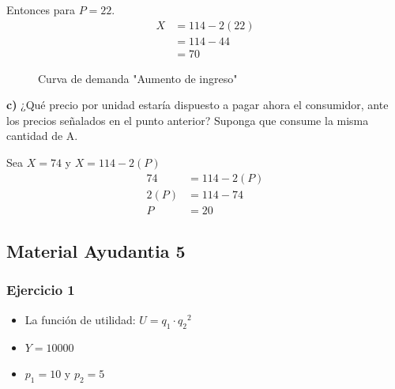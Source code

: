 \documentclass{templateNote}
\begin{document}
Entonces para $P = 22$.
\begin{align*}
    X &= 114 -2(22) \\
    &= 114 -44 \\
    &= 70
\end{align*}

\begin{figure}[H]
    \centering
    \caption{Curva de demanda "Aumento de ingreso"}
\end{figure}

\textbf{c)} ¿Qué precio por unidad estaría dispuesto a pagar ahora el consumidor, ante los
precios señalados en el punto anterior? Suponga que consume la misma cantidad
de A.

Sea $X = 74$ y $X = 114 -2(P)$\\
\begin{align*}
    74 &= 114 -2(P) \\
    2(P) &= 114 -74 \\
    P &= 20
\end{align*}

\newpage
\subsection{Material Ayudantia 5}
\subsubsection{Ejercicio 1}
\begin{itemize}
    \item La función de utilidad: $ U = q_1 \cdot {q_2}^2$
    \item $Y = 10000$
    \item $p_1 = 10$ y $p_2 = 5$
\end{itemize}
\end{document}
